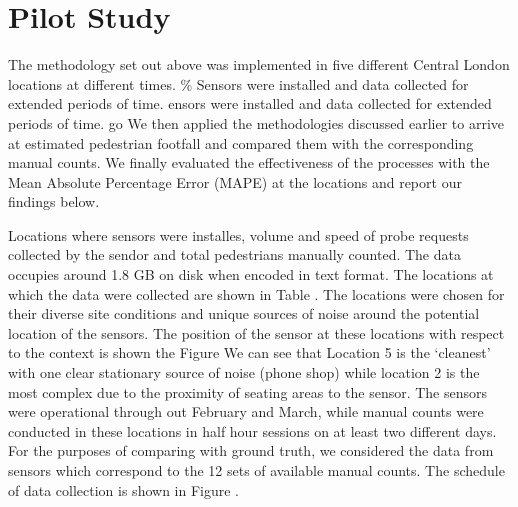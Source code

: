 \section{Pilot Study}

The methodology set out above was implemented in five different Central London locations at different times.
\% Sensors were installed and data collected for extended periods of time.
ensors were installed and data collected for extended periods of time.
go
We then applied the methodologies discussed earlier to arrive at estimated pedestrian footfall and compared them with the corresponding manual counts.
We finally evaluated the effectiveness of the processes with the Mean Absolute Percentage Error (MAPE) at the locations and report our findings below.

Locations where sensors were installes, volume and speed of probe requests collected by the sendor and total pedestrians manually counted.
The data occupies around 1.8 GB on disk when encoded in text format.
The locations at which the data were collected are shown in Table .
The locations were chosen for their diverse site conditions and unique sources of noise around the potential location of the sensors.
The position of the sensor at these locations with respect to the context is shown the Figure 
We can see that Location 5 is the `cleanest' with one clear stationary source of noise (phone shop) while location 2 is the most complex due to the proximity of seating areas to the sensor.
The sensors were operational through out February and March, while manual counts were conducted in these locations in half hour sessions on at least two different days.
For the purposes of comparing with ground truth, we considered the data from sensors which correspond to the 12 sets of available manual counts.
The schedule of data collection is shown in Figure .


